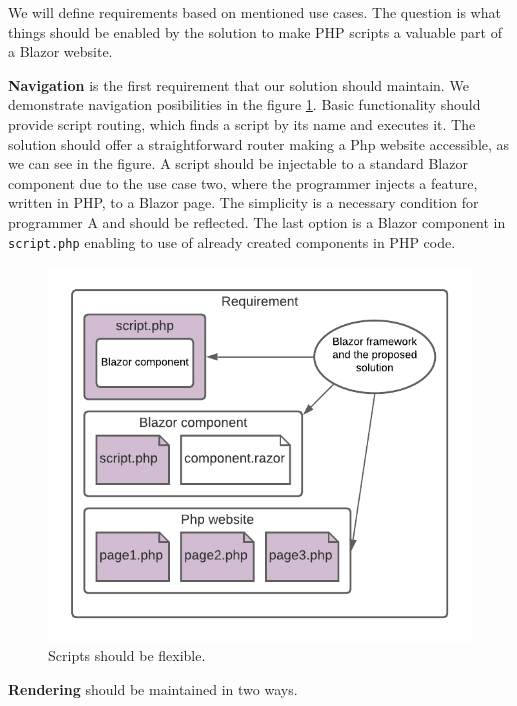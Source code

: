 We will define requirements based on mentioned use cases.
The question is what things should be enabled by the solution to make PHP scripts a valuable part of a Blazor website.
\par
\textbf{Navigation} is the first requirement that our solution should maintain.
We demonstrate navigation posibilities in the figure \ref{img10:scripts}.
Basic functionality should provide script routing, which finds a script by its name and executes it.
The solution should offer a straightforward router making a Php website accessible, as we can see in the figure.
A script should be injectable to a standard Blazor component due to the use case two, where the programmer injects a feature, written in PHP, to a Blazor page.
The simplicity is a necessary condition for programmer A and should be reflected.
The last option is a Blazor component in \texttt{script.php} enabling to use of already created components in PHP code.
\par
{}
\begin{figure}[!b]\centering
\includegraphics{./img/Requirement}
\caption{Scripts should be flexible.}
\label{img10:scripts}
\end{figure} 
\par
\textbf{Rendering} should be maintained in two ways.
